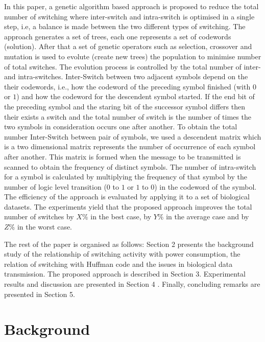 \documentclass[preprint,12pt]{elsarticle}
\begin{document}
In this paper, a genetic algorithm based approach is proposed to reduce the total number of switching where inter-switch and intra-switch is optimised in a single step, i.e, a balance is made between the two different types of switching. The approach generates a set of trees, each one represents a set of codewords (solution). After that a set of genetic operators such as selection, crossover and mutation is used to evolute (create new trees) the population to minimise number of total switches. The evolution process is controlled by the total number of inter- and intra-switches.  Inter-Switch between two adjacent symbols depend on the their codewords, i.e., how the codeword of the preceding symbol finished (with $0$ or $1$) and how the codeword for the descendent symbol started. If the end bit of the preceding symbol and the staring bit of the successor symbol differs then their exists a switch and the total number of switch is the number of times the two symbols in consideration occurs one after another. To obtain the total number Inter-Switch between pair of symbols, we used a descendent matrix which is a two dimensional matrix represents the number of occurrence of each symbol after another. This matrix is formed when the message to be transmitted is scanned to obtain the frequency of distinct symbols. The number of intra-switch for a symbol is calculated by multiplying the frequency of that symbol by the number of logic level transition ($0$ to $1$ or $1$ to $0$) in the codeword of the symbol. The efficiency of the approach is evaluated by applying it to a set of biological datasets. The experiments yield that the proposed approach improves the total number of switches by $X\%$ in the best case, by $Y\%$ in the average case and by $Z\%$
in the worst case.

The rest of the paper is organised as follows:
Section 2 presents the background study of the
relationship of switching activity with power consumption, the relation of switching with Huffman code and the issues in biological data transmission. The proposed approach is described in Section 3. Experimental results and
discussion are presented in Section 4 . Finally,
concluding remarks are presented in Section 5. 
\section{Background}
\end{document}
